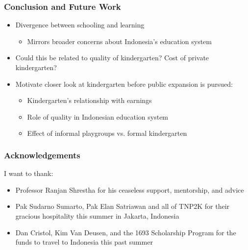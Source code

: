 \documentclass{beamer}
\begin{document}
\begin{frame}
\frametitle{Conclusion and Future Work}
\begin{itemize}
	\item Divergence between schooling and learning
	\begin{itemize}
		\item Mirrors broader concerns about Indonesia's education system
	\end{itemize}
	\vspace{0.1in}
	\item Could this be related to quality of kindergarten? Cost of private kindergarten? 
	\vspace{0.1in}
	\item Motivate closer look at kindergarten before public expansion is pursued:
	\begin{itemize}
		\item Kindergarten's relationship with earnings 
		\item Role of quality in Indonesian education system
		\item Effect of informal playgroups vs. formal kindergarten
	\end{itemize}
\end{itemize}
\end{frame}

\begin{frame}
\frametitle{Acknowledgements} 
I want to thank:
\vspace{0.1in}
\begin{itemize} 
	\item Professor Ranjan Shrestha for his ceaseless support, mentorship, and advice
	\item Pak Sudarno Sumarto, Pak Elan Satriawan and all of TNP2K for their gracious hospitality this summer in Jakarta, Indonesia
	\item Dan Cristol, Kim Van Deusen, and the 1693 Scholarship Program for the funds to travel to Indonesia this past summer 
\end{itemize}
\end{frame}
\end{document}
